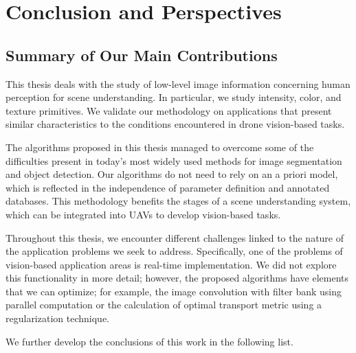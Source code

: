 \chapter*{Conclusion and Perspectives}\label{ch:general_conclusion}

\section*{Summary of Our Main Contributions}


This thesis deals with the study of low-level image information concerning human perception for scene understanding. In particular, we study intensity, color, and texture primitives. We validate our methodology on applications that present similar characteristics to the conditions encountered in drone vision-based tasks.

The algorithms proposed in this thesis managed to overcome some of the difficulties present in today's most widely used methods for image segmentation and object detection. Our algorithms do not need to rely on an a priori model, which is reflected in the independence of parameter definition and annotated databases. This methodology benefits the stages of a scene understanding system, which can be integrated into UAVs to develop vision-based tasks.

Throughout this thesis, we encounter different challenges linked to the nature of the application problems we seek to address. Specifically, one of the problems of vision-based application areas is real-time implementation. We did not explore this functionality in more detail; however, the proposed algorithms have elements that we can optimize; for example, the image convolution with filter bank using parallel computation or the calculation of optimal transport metric using a regularization technique. 

We further develop the conclusions of this work in the following list.

